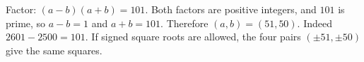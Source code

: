Factor: $(a-b)(a+b)=101 $. Both factors are positive integers, and $ 101 $ is prime, so $ a-b=1 $ and $ a+b=101 $. Therefore $\boxed{(a,b)=(51,50)}$. Indeed $ 2601-2500=101 $. If signed square roots are allowed, the four pairs $(\pm51,\pm50)$ give the same squares.
